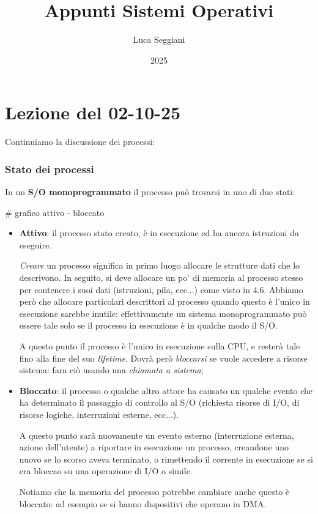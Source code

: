 \documentclass[a4paper,11pt]{article}
\title{Appunti Sistemi Operativi}
\author{Luca Seggiani}
\date{2025}
\begin{document}
\section{Lezione del 02-10-25}

\thispagestyle{empty}
\pagestyle{fancy}

Continuiamo la discussione dei processi:

\subsubsection{Stato dei processi}
In un \textbf{S/O monoprogrammato} il processo può trovarsi in uno di due stati:

# grafico attivo - bloccato

\begin{itemize}
	\item \textbf{Attivo}: il processo stato creato, è in esecuzione ed ha ancora istruzioni da eseguire. 

		\textit{Creare} un processo significa in primo luogo allocare le strutture dati che lo descrivono. In seguito, si deve allocare un po' di memoria al processo stesso per contenere i suoi dati (istruzioni, pila, ecc...) come visto in 4.6.
	Abbiamo però che allocare particolari descrittori al processo quando questo è l'unico in esecuzione sarebbe inutile: effettivamente un sistema monoprogrammato può essere tale solo se il processo in esecuzione è in qualche modo il S/O.

		A questo punto il processo è l'unico in esecuzione sulla CPU, e resterà tale fino alla fine del suo \textit{lifetime}.
		Dovrà però \textit{bloccarsi} se vuole accedere a risorse sistema: fara ciò usando una \textit{chiamata a sistema};

	\item \textbf{Bloccato}: il processo o qualche altro attore ha causato un qualche evento che ha determinato il passaggio di controllo al S/O (richiesta risorse di I/O, di risorse logiche, interruzioni esterne, ecc...).

		A questo punto sarà nuovamente un evento esterno (interruzione esterna, azione dell'utente) a riportare in esecuzione un processo, creandone uno nuovo se lo scorso aveva terminato, o rimettendo il corrente in esecuzione se si era bloccao su una operazione di I/O o simile.

		Notiamo che la memoria del processo potrebbe cambiare anche questo è bloccato: ad esempio se si hanno dispositivi che operano in DMA. 
\end{itemize}
\end{document}
